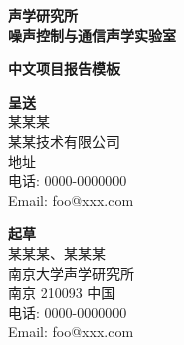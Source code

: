 \documentclass{ProjectReportCn}
\date{\today}
\def\titlestr{中文项目报告模板}
\begin{document}
\makeatletter
\begin{titlepage}
    \centering
    \vspace{1cm}

    \vspace{-.5cm}
    {\LARGE \bfseries 声学研究所\\[5mm] 噪声控制与通信声学实验室}

    \vspace{4cm}

    { \fontsize{36}{72}\selectfont \bfseries \titlestr}

    \vspace{.5cm}
    {\bfseries \Large \@date}

    \vfill
    \noindent
    \begin{minipage}[t]{.5\textwidth}
        \raggedright
        \doublespacing
        {\LARGE \textbf{呈送}}\\
        {\large 某某某}\\
        {\large 某某技术有限公司}\\
        {\large 地址}\\
        {\large 电话: 0000-0000000}\\
        {\large Email: foo@xxx.com}\\
    \end{minipage}%
    \begin{minipage}[t]{.5\textwidth}
        \raggedleft
        \doublespacing
        {\LARGE \textbf{起草}}\\
        {\large 某某某、某某某}\\
        {\large 南京大学声学研究所}\\
        {\large 南京 210093 中国}\\
        {\large 电话: 0000-0000000}\\
        {\large Email: foo@xxx.com}\\
    \end{minipage}
\end{titlepage}
\makeatother
\end{document}
